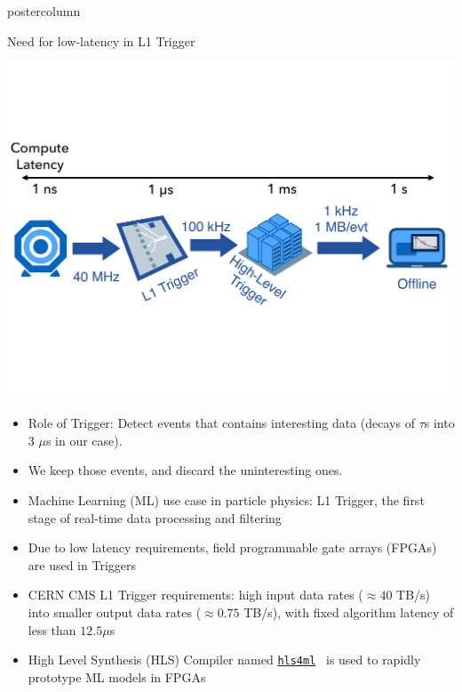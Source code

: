 \documentclass[final,hyperref={pdfpagelabels=false}]{beamer}
\newcommand{\hlsfml}{{\href{https://github.com/hls-fpga-machine-learning/hls4ml}{\texttt{hls4ml}}}}
\begin{document}
\begin{frame}
\begin{columns}
\begin{column}{.49\textwidth}
\begin{beamercolorbox}[center,wd=\textwidth]{postercolumn}
\begin{minipage}[T]{.95\textwidth}
{            \begin{block}{Need for low-latency in L1 Trigger}
                  \begin{center}
                    \includegraphics[viewport=0 200 1024 600, clip=true,width=\linewidth]{figures/cms_dataflow.pdf}
                  \end{center}
                  \begin{itemize}
                  \item Role of Trigger: Detect events that contains interesting data (decays of $\tau$s into 3 $\mu$s in our case).
                  \item We keep those events, and discard the uninteresting ones.
                    \item Machine Learning (ML) use case in particle physics: L1 Trigger, the first stage of real-time data processing and filtering
                     \item Due to low latency requirements, field programmable gate arrays (FPGAs) are used in Triggers
                    \item CERN CMS L1 Trigger requirements: high input data rates ($\approx40$ TB/s) into smaller output data rates ($\approx0.75$ TB/s), 
                    with fixed algorithm latency of less than $12.5 \mu$s
                    \item High Level Synthesis (HLS) Compiler named \hlsfml~ is used to rapidly prototype ML models in FPGAs
              \end{itemize}
            \end{block}
            
}
\end{minipage}
\end{beamercolorbox}
\end{column}
\end{columns}
\end{frame}
\end{document}
